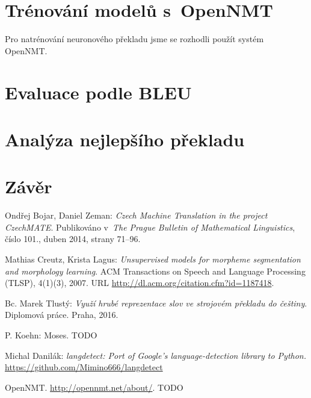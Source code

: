\documentclass[a4]{article}
\begin{document}
\section{Trénování modelů s~OpenNMT}

Pro natrénování neuronového překladu jsme se rozhodli použít systém
OpenNMT\cite{opennmt}. 
%
%
%
%
%
%
%
%
\section{Evaluace podle BLEU}



\section{Analýza nejlepšího překladu}

\section{Závěr}


\begin{thebibliography}{99}



 Ondřej Bojar, Daniel Zeman: {\sl Czech Machine Translation in the project
 CzechMATE}. Publikováno v~{\sl The Prague Bulletin of Mathematical
 Linguistics}, číslo 101., duben 2014, strany 71–96.

	Mathias Creutz, Krista Lagus: {\sl Unsupervised models for morpheme
	segmentation and
	morphology learning}. ACM Transactions on Speech and Language Processing
	(TLSP), 4(1)(3),
	2007. URL \url{http://dl.acm.org/citation.cfm?id=1187418}.

 Bc. Marek Tlustý: {\sl  Využí hrubé reprezentace slov ve strojovém
překladu do češtiny}. Diplomová práce. Praha, 2016.

 P. Koehn: Moses. TODO 



 Michal Danilák: {\sl langdetect: Port of Google's language-detection library to
 Python.}
 \url{https://github.com/Mimino666/langdetect}

 OpenNMT. \url{http://opennmt.net/about/}. TODO





\end{thebibliography}
\end{document}
